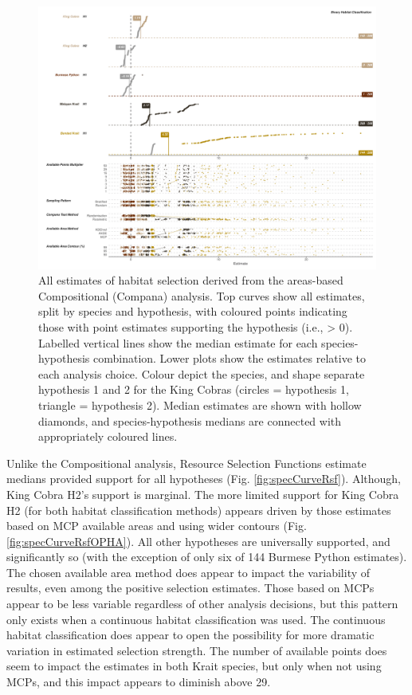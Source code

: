 \documentclass[10pt,a4paper]{article}
\begin{document}
\begin{figure}
\includegraphics[width=1\linewidth]{../../figures/specCurve_area} \caption{All estimates of habitat selection derived from the areas-based Compositional (Compana) analysis. Top curves show all estimates, split by species and hypothesis, with coloured points indicating those with point estimates supporting the hypothesis (i.e., > 0). Labelled vertical lines show the median estimate for each species-hypothesis combination. Lower plots show the estimates relative to each analysis choice. Colour depict the species, and shape separate hypothesis 1 and 2 for the King Cobras (circles = hypothesis 1, triangle = hypothesis 2). Median estimates are shown with hollow diamonds, and species-hypothesis medians are connected with appropriately coloured lines.}\label{fig:specCurveArea}
\end{figure}

Unlike the Compositional analysis, Resource Selection Functions estimate medians provided support for all hypotheses (Fig. \ref{fig:specCurveRsf}).
Although, King Cobra H2's support is marginal.
The more limited support for King Cobra H2 (for both habitat classification methods) appears driven by those estimates based on MCP available areas and using wider contours (Fig. \ref{fig:specCurveRsfOPHA}).
All other hypotheses are universally supported, and significantly so (with the exception of only six of 144 Burmese Python estimates).
The chosen available area method does appear to impact the variability of results, even among the positive selection estimates.
Those based on MCPs appear to be less variable regardless of other analysis decisions, but this pattern only exists when a continuous habitat classification was used.
The continuous habitat classification does appear to open the possibility for more dramatic variation in estimated selection strength.
The number of available points does seem to impact the estimates in both Krait species, but only when not using MCPs, and this impact appears to diminish above 29.
\end{document}
